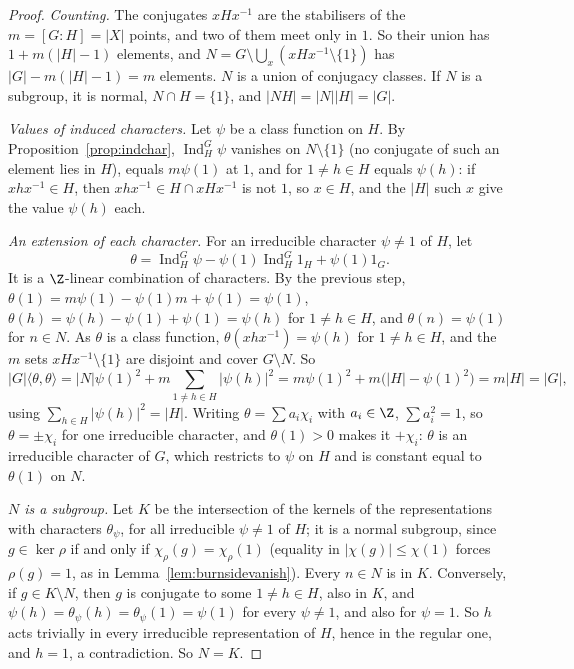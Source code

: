 \begin{proof}
\emph{Counting.} The conjugates $xHx^{-1}$ are the stabilisers of the $m=[G:H]=|X|$ points, and two of them meet only in $1$. So their union has $1+m(|H|-1)$ elements, and $N=G\setminus\bigcup_x(xHx^{-1}\setminus\{1\})$ has
$|G|-m(|H|-1)=m$ elements. $N$ is a union of conjugacy classes. If $N$ is a subgroup, it is normal, $N\cap H=\{1\}$, and $|NH|=|N||H|=|G|$.

\emph{Values of induced characters.} Let $\psi$ be a class function on $H$. By Proposition~\ref{prop:indchar}, $\operatorname{Ind}_H^G\psi$ vanishes on $N\setminus\{1\}$ (no conjugate of such an element lies in $H$), equals $m\psi(1)$ at $1$,
and for $1\ne h\in H$ equals $\psi(h)$: if $xhx^{-1}\in H$, then $xhx^{-1}\in H\cap xHx^{-1}$ is not $1$, so $x\in H$, and the $|H|$ such $x$ give the value $\psi(h)$ each.

\emph{An extension of each character.} For an irreducible character $\psi\ne1$ of $H$, let
\[
\theta=\operatorname{Ind}_H^G\psi-\psi(1)\operatorname{Ind}_H^G1_H+\psi(1)1_G .
\]
It is a $\Z$-linear combination of characters. By the previous step, $\theta(1)=m\psi(1)-\psi(1)m+\psi(1)=\psi(1)$, $\theta(h)=\psi(h)-\psi(1)+\psi(1)=\psi(h)$ for $1\ne h\in H$, and $\theta(n)=\psi(1)$ for $n\in N$. As $\theta$ is a class function, $\theta(xhx^{-1})=\psi(h)$ for $1\ne h\in H$, and the $m$ sets
$xHx^{-1}\setminus\{1\}$ are disjoint and cover $G\setminus N$. So
\[
|G|\langle\theta,\theta\rangle=|N|\psi(1)^2+m\sum_{1\ne h\in H}|\psi(h)|^2=m\psi(1)^2+m\bigl(|H|-\psi(1)^2\bigr)=m|H|=|G|,
\]
using $\sum_{h\in H}|\psi(h)|^2=|H|$. Writing $\theta=\sum a_i\chi_i$ with $a_i\in\Z$, $\sum a_i^2=1$, so $\theta=\pm\chi_i$ for one irreducible character, and $\theta(1)>0$ makes it $+\chi_i$: $\theta$ is an irreducible character of $G$, which
restricts to $\psi$ on $H$ and is constant equal to $\theta(1)$ on $N$.

\emph{$N$ is a subgroup.} Let $K$ be the intersection of the kernels of the representations with characters $\theta_\psi$, for all irreducible $\psi\ne1$ of $H$; it is a normal subgroup, since $g\in\ker\rho$ if and only if
$\chi_\rho(g)=\chi_\rho(1)$ (equality in $|\chi(g)|\le\chi(1)$ forces $\rho(g)=1$, as in Lemma~\ref{lem:burnsidevanish}). Every $n\in N$ is in $K$. Conversely, if $g\in K\setminus N$, then $g$ is conjugate to some $1\ne h\in H$, also in $K$, and
$\psi(h)=\theta_\psi(h)=\theta_\psi(1)=\psi(1)$ for every $\psi\ne1$, and also for $\psi=1$. So $h$ acts trivially in every irreducible representation of $H$, hence in the regular one, and $h=1$, a contradiction. So $N=K$.
\end{proof}

